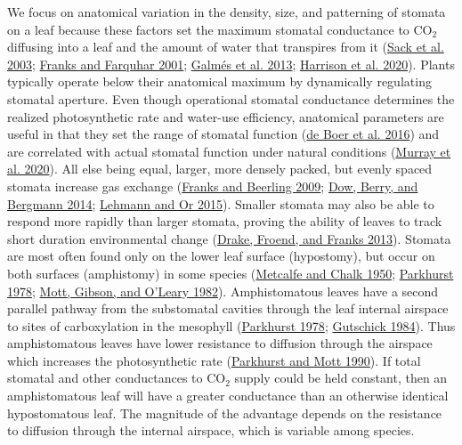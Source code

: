 \documentclass[
  12pt,
]{article}
\begin{document}
We focus on anatomical variation in the density, size, and patterning of stomata on a leaf because these factors set the maximum stomatal conductance to CO\(_2\) diffusing into a leaf and the amount of water that transpires from it (\protect\hyperlink{ref-sack_hydrology_2003}{Sack et al. 2003}; \protect\hyperlink{ref-franks_effect_2001}{Franks and Farquhar 2001}; \protect\hyperlink{ref-galmes_leaf_2013}{Galmés et al. 2013}; \protect\hyperlink{ref-harrison_influence_2020}{Harrison et al. 2020}). Plants typically operate below their anatomical maximum by dynamically regulating stomatal aperture. Even though operational stomatal conductance determines the realized photosynthetic rate and water-use efficiency, anatomical parameters are useful in that they set the range of stomatal function (\protect\hyperlink{ref-de_boer_optimal_2016}{de Boer et al. 2016}) and are correlated with actual stomatal function under natural conditions (\protect\hyperlink{ref-murray_consistent_2020}{Murray et al. 2020}). All else being equal, larger, more densely packed, but evenly spaced stomata increase gas exchange (\protect\hyperlink{ref-franks_maximum_2009}{Franks and Beerling 2009}; \protect\hyperlink{ref-dow_physiological_2014}{Dow, Berry, and Bergmann 2014}; \protect\hyperlink{ref-lehmann_effects_2015}{Lehmann and Or 2015}). Smaller stomata may also be able to respond more rapidly than larger stomata, proving the ability of leaves to track short duration environmental change (\protect\hyperlink{ref-drake_smaller_2013}{Drake, Froend, and Franks 2013}). Stomata are most often found only on the lower leaf surface (hypostomy), but occur on both surfaces (amphistomy) in some species (\protect\hyperlink{ref-metcalfe_anatomy_1950}{Metcalfe and Chalk 1950}; \protect\hyperlink{ref-parkhurst_adaptive_1978}{Parkhurst 1978}; \protect\hyperlink{ref-mott_adaptive_1982}{Mott, Gibson, and O'Leary 1982}). Amphistomatous leaves have a second parallel pathway from the substomatal cavities through the leaf internal airspace to sites of carboxylation in the mesophyll (\protect\hyperlink{ref-parkhurst_adaptive_1978}{Parkhurst 1978}; \protect\hyperlink{ref-gutschick_photosynthesis_1984}{Gutschick 1984}). Thus amphistomatous leaves have lower resistance to diffusion through the airspace which increases the photosynthetic rate (\protect\hyperlink{ref-parkhurst_intercellular_1990}{Parkhurst and Mott 1990}). If total stomatal and other conductances to CO\(_2\) supply could be held constant, then an amphistomatous leaf will have a greater conductance than an otherwise identical hypostomatous leaf. The magnitude of the advantage depends on the resistance to diffusion through the internal airspace, which is variable among species.
\end{document}
